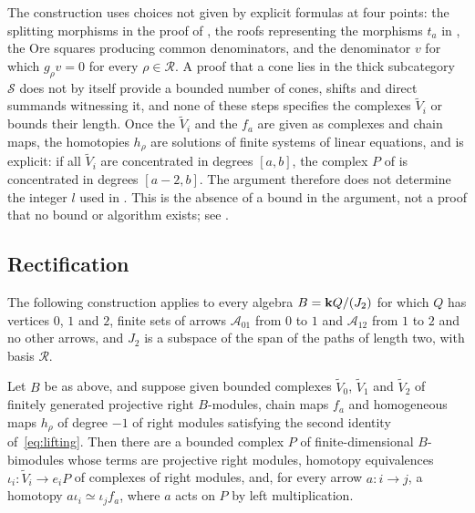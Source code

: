 \begin{remark}
  \label{rem:uncontrolled-length}
  The construction uses choices not given by explicit formulas at four points:
  the
  splitting morphisms in the proof of , the roofs
  representing the morphisms $t_a$ in , the Ore squares
  producing common denominators, and the denominator $v$ for which ${g_\rho v=0}$
  for every ${\rho\in\mathcal R}$. A proof that a cone lies in the thick
  subcategory
  $\mathcal{S}$ does not by itself provide a bounded number of cones, shifts
  and direct summands witnessing it, and none of these steps specifies the
  complexes $\widetilde{V}_i$ or bounds their length. Once the
  $\widetilde{V}_i$ and the $f_a$ are given as complexes and chain maps, the
  homotopies $h_\rho$ are solutions of finite systems of linear equations, and
   is explicit: if all $\widetilde{V}_i$ are
  concentrated in degrees $[a,b]$, the complex $P$ of
   is concentrated in degrees ${[a-2,b]}$. The argument
  therefore does not determine the integer $l$ used in .
  This is the
  absence of a bound in the argument, not a proof that no bound or algorithm
  exists; see .
\end{remark}

\subsection{Rectification}
\label{subsec:rectification}

The following construction applies to every algebra ${B}={\mathbf{k} Q/(J_2)}$ for which
$Q$
has vertices $0$, $1$ and $2$, finite sets of arrows $\mathcal{A}_{01}$ from
$0$ to $1$ and $\mathcal{A}_{12}$ from $1$ to $2$ and no other arrows, and
$J_2$ is a subspace of the span of the paths of length two, with basis
$\mathcal{R}$.

\begin{proposition}
  \label{prop:rectification}
  Let $B$ be as above, and suppose given bounded complexes
  $\widetilde{V}_0$, $\widetilde{V}_1$ and $\widetilde{V}_2$ of finitely
  generated projective right $B$-modules, chain maps $f_a$ and homogeneous
  maps $h_\rho$ of degree ${-1}$ of right modules satisfying the second identity
  of~\eqref{eq:lifting}. Then there are a bounded complex $P$ of
  finite-dimensional $B$-bimodules whose terms are projective right modules,
  homotopy equivalences ${\iota_i\colon\widetilde{V}_i\to e_iP}$ of complexes of
  right modules, and, for every arrow ${a\colon i\to j}$, a homotopy
  ${a\iota_i\simeq\iota_jf_a}$, where $a$ acts on $P$ by left multiplication.
\end{proposition}

